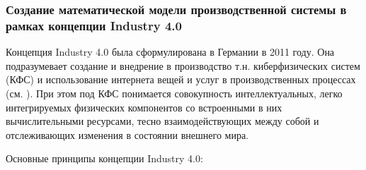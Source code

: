 \subsubsection{Создание математической модели производственной системы в рамках концепции Industry 4.0}

Концепция Industry 4.0 была сформулирована в Германии в 2011 году. Она подразумевает создание и внедрение в производство т.н. киберфизических систем (КФС) и использование интернета вещей и услуг в производственных процессах (см. ). При этом под КФС понимается совокупность интеллектуальных, легко интегрируемых физических компонентов со встроенными в них вычислительными ресурсами, тесно взаимодействующих между собой и отслеживающих изменения в состоянии внешнего мира.

Основные принципы концепции Industry 4.0:

